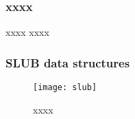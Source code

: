 \begin{frame}[plain,t]
    
    \frametitle{xxxx}
    
    
    \begin{block}{xxxx}
        xxxx

    \end{block} 
    
    
    \begin{figure}
        \centering
    \end{figure}
    
\end{frame}
\begin{frame}[plain,t]    
    \frametitle{SLUB data structures}
    \begin{figure}
        \centering
        \texttt{[image: slub]}
        \caption{xxxx}
    \end{figure}
\end{frame}


